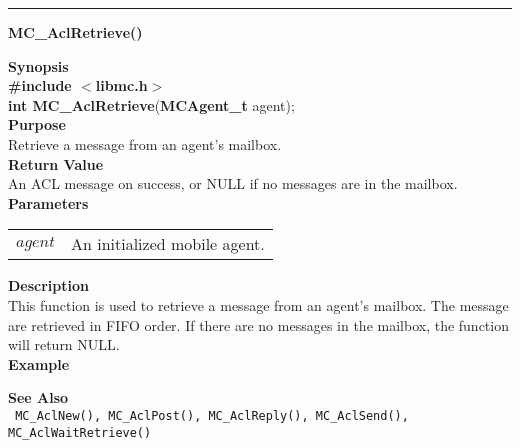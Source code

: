 \noindent
\vspace{5pt}
\rule{6.5in}{0.015in}
\noindent
{}
{\LARGE \bf MC\_AclRetrieve()}\\
\label{api:MC_AclRetrieve()}

\noindent
{\bf Synopsis}\\
{\bf \#include $<$libmc.h$>$}\\
{\bf int MC\_AclRetrieve}({\bf MCAgent\_t} agent);\\

\noindent
{\bf Purpose}\\
Retrieve a message from an agent's mailbox.\\

\noindent
{\bf Return Value}\\
An ACL message on success, or NULL if no messages are in the 
mailbox.\\

\noindent
{\bf Parameters}
\vspace{-0.1in}
\begin{description}
\item
\begin{tabular}{p{10 mm}p{145 mm}} 
$agent$ & An initialized mobile agent.
\end{tabular}
\end{description}

\noindent
{\bf Description}\\
This function is used to retrieve a message from an agent's mailbox. The
message are retrieved in FIFO order. If there are no messages in the
mailbox, the function will return NULL.\\

\noindent
{\bf Example}\\
\noindent
{\footnotesize}

\noindent
{\bf See Also}\\
\texttt{
  MC\_AclNew(), MC\_AclPost(), MC\_AclReply(), MC\_AclSend(), \linebreak
    MC\_AclWaitRetrieve()
}


